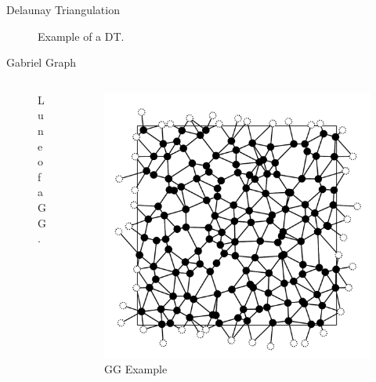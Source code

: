 \documentclass{beamer}
\begin{document}
        \begin{frame}{Delaunay Triangulation}
            \begin{figure}[htbp]
                \centering
                
                \caption
                {
                    Example of a DT.
                }
            \end{figure}
        \end{frame}

        \begin{frame}{Gabriel Graph}
            \begin{columns}[b]
                \begin{column}{5cm}
                    \begin{figure}[htbp]
                        \centering
                        
                        \caption
                        {
                            Lune of a GG.
                        }
                    \end{figure}
                \end{column}
                \begin{column}{5cm}
                    \begin{figure}[htbp]
                        \centering
                        \includegraphics[width=1\textwidth]{images/GG/L12S03.pdf}
                        \caption
                        {
                            GG Example
                        }
                    \end{figure}
                \end{column}
            \end{columns}
        \end{frame}
\end{document}
